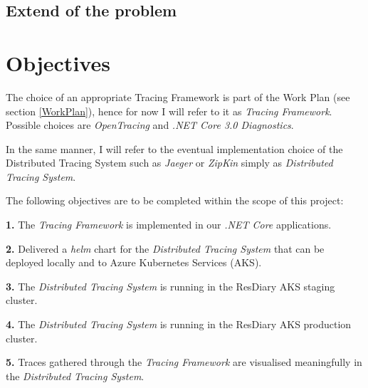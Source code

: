 \documentclass[11pt]{article}
\begin{document}

\subsection{Extend of the problem}



\section{Objectives} 


The choice of an appropriate Tracing Framework is part of the Work Plan (see section \ref{WorkPlan}), hence for now I will refer to it as \textit{Tracing Framework}. Possible choices are \textit{OpenTracing} and \textit{.NET Core 3.0 Diagnostics}.

In the same manner, I will refer to the eventual implementation choice of the Distributed Tracing System such as \textit{Jaeger} or \textit{ZipKin} simply as \textit{Distributed Tracing System}.

The following objectives are to be completed within the scope of this project:

\textbf{1.} The \textit{Tracing Framework} is implemented in our \textit{.NET Core} applications.


\textbf{2.} Delivered a \textit{helm} chart for the \textit{Distributed Tracing System} that can be deployed locally and to Azure Kubernetes Services (AKS).

\textbf{3.} The \textit{Distributed Tracing System} is running in the ResDiary AKS staging cluster.

\textbf{4.} The \textit{Distributed Tracing System} is running in the ResDiary AKS production cluster.

\textbf{5.} Traces gathered through the \textit{Tracing Framework} are visualised meaningfully in the \textit{Distributed Tracing System}.
\end{document}
